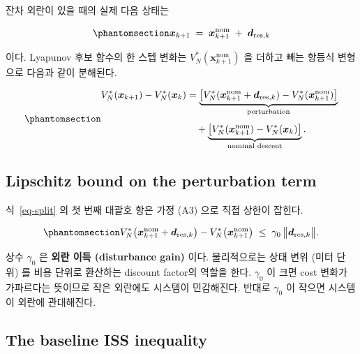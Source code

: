 \documentclass[
  11pt,
]{article}
\theoremstyle{plain}
\theoremstyle{plain}
\theoremstyle{definition}
\theoremstyle{remark}
\begin{document}
잔차 외란이 있을 때의 실제 다음 상태는

\begin{equation}\protect\phantomsection\label{eq-disturbed-succ}{
\bm{x}_{k+1} \;=\; \bm{x}_{k+1}^{\mathrm{nom}}
\;+\; \bm{d}_{\mathrm{res},k}
}\end{equation}

이다. Lyapunov 후보 함수의 한 스텝 변화는
\(V_N^*(\bm{x}_{k+1}^{\mathrm{nom}})\) 을 더하고 빼는 항등식 변형으로
다음과 같이 분해된다.

\begin{equation}\protect\phantomsection\label{eq-split}{
\begin{aligned}
V_N^*(\bm{x}_{k+1}) - V_N^*(\bm{x}_k)
&= \underbrace{\bigl[V_N^*(\bm{x}_{k+1}^{\mathrm{nom}}
                 + \bm{d}_{\mathrm{res},k})
        - V_N^*(\bm{x}_{k+1}^{\mathrm{nom}})\bigr]}_{\text{perturbation}}
\\[4pt]
&\quad+ \underbrace{\bigl[V_N^*(\bm{x}_{k+1}^{\mathrm{nom}})
        - V_N^*(\bm{x}_k)\bigr]}_{\text{nominal descent}}.
\end{aligned}
}\end{equation}

\subsection{Lipschitz bound on the perturbation
term}\label{lipschitz-bound-on-the-perturbation-term}

식~\ref{eq-split} 의 첫 번째 대괄호 항은 가정 (A3) 으로 직접 상한이
잡힌다.

\begin{equation}\protect\phantomsection\label{eq-lip}{
V_N^*\bigl(\bm{x}_{k+1}^{\mathrm{nom}} + \bm{d}_{\mathrm{res},k}\bigr)
- V_N^*\bigl(\bm{x}_{k+1}^{\mathrm{nom}}\bigr)
\;\le\; \gamma_0\,\bigl\|\bm{d}_{\mathrm{res},k}\bigr\|.
}\end{equation}

상수 \(\gamma_0\) 은 \textbf{외란 이득 (disturbance gain)} 이다.
물리적으로는 상태 변위 (미터 단위) 를 비용 단위로 환산하는 discount
factor의 역할을 한다. \(\gamma_0\) 이 크면 cost 변화가 가파르다는
뜻이므로 작은 외란에도 시스템이 민감해진다. 반대로 \(\gamma_0\) 이
작으면 시스템이 외란에 관대해진다.

\subsection{The baseline ISS
inequality}\label{the-baseline-iss-inequality}
\end{document}
